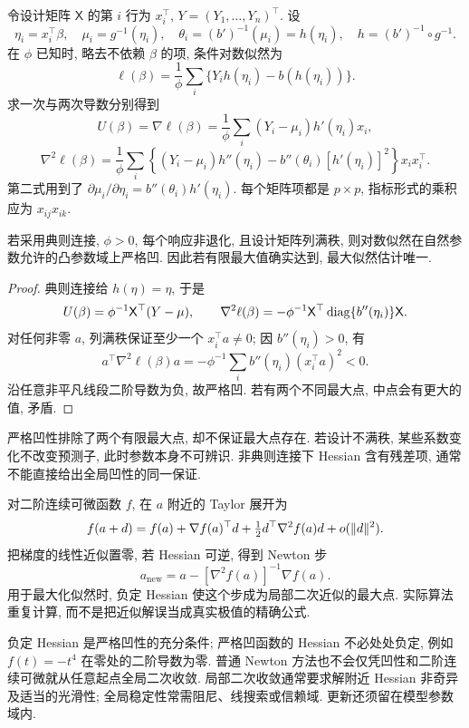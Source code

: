 令设计矩阵 $\mathsf X$ 的第 $i$ 行为 $x_i^\top$, $Y=(Y_1,\ldots,Y_n)^\top$. 设
\[
 \eta_i=x_i^\top\beta,\quad\mu_i=g^{-1}(\eta_i),\quad
 \theta_i=(b')^{-1}(\mu_i)=h(\eta_i),\quad
 h=(b')^{-1}\circ g^{-1}.
\]
在 $\phi$ 已知时, 略去不依赖 $\beta$ 的项, 条件对数似然为
\[
 \ell(\beta)=\frac1\phi\sum_i\{Y_ih(\eta_i)-b(h(\eta_i))\}.
\]
求一次与两次导数分别得到
\[
 U(\beta)=\nabla\ell(\beta)
 =\frac1\phi\sum_i(Y_i-\mu_i)h'(\eta_i)x_i,
\]
\[
 \nabla^2\ell(\beta)
 =\frac1\phi\sum_i\left\{(Y_i-\mu_i)h''(\eta_i)
                  -b''(\theta_i)[h'(\eta_i)]^2\right\}x_ix_i^\top.
\]
第二式用到了 $\partial\mu_i/\partial\eta_i=b''(\theta_i)h'(\eta_i)$. 每个矩阵项都是 $p\times p$, 指标形式的乘积应为 $x_{ij}x_{ik}$. 

\begin{proposition}[典则连接下的凹性]
若采用典则连接, $\phi>0$, 每个响应非退化, 且设计矩阵列满秩, 则对数似然在自然参数允许的凸参数域上严格凹. 因此若有限最大值确实达到, 最大似然估计唯一. 
\end{proposition}
\begin{proof}
典则连接给 $h(\eta)=\eta$, 于是
\[
 U(\beta)=\phi^{-1}\mathsf X^\top(Y-\mu),\qquad
 \nabla^2\ell(\beta)=-\phi^{-1}\mathsf X^\top
      \operatorname{diag}\{b''(\eta_i)\}\mathsf X.
\]
对任何非零 $a$, 列满秩保证至少一个 $x_i^\top a\ne0$; 因 $b''(\eta_i)>0$, 有
\[
 a^\top\nabla^2\ell(\beta)a
 =-\phi^{-1}\sum_i b''(\eta_i)(x_i^\top a)^2<0.
\]
沿任意非平凡线段二阶导数为负, 故严格凹. 若有两个不同最大点, 中点会有更大的值, 矛盾. 
\end{proof}
严格凹性排除了两个有限最大点, 却不保证最大点存在. 若设计不满秩, 某些系数变化不改变预测子, 此时参数本身不可辨识. 非典则连接下 Hessian 含有残差项, 通常不能直接给出全局凹性的同一保证. 

对二阶连续可微函数 $f$, 在 $a$ 附近的 Taylor 展开为
\[
 f(a+d)=f(a)+\nabla f(a)^\top d
          +\tfrac12 d^\top\nabla^2f(a)d+o(\lVert d\rVert^2).
\]
把梯度的线性近似置零, 若 Hessian 可逆, 得到 Newton 步
\[
 a_{\mathrm{new}}=a-[\nabla^2f(a)]^{-1}\nabla f(a).
\]
用于最大化似然时, 负定 Hessian 使这个步成为局部二次近似的最大点. 实际算法重复计算, 而不是把近似解误当成真实极值的精确公式. 

\begin{remark}[收敛与二阶条件]
负定 Hessian 是严格凹性的充分条件; 严格凹函数的 Hessian 不必处处负定, 例如 $f(t)=-t^4$ 在零处的二阶导数为零. 普通 Newton 方法也不会仅凭凹性和二阶连续可微就从任意起点全局二次收敛. 局部二次收敛通常要求解附近 Hessian 非奇异及适当的光滑性; 全局稳定性常需阻尼、线搜索或信赖域. 更新还须留在模型参数域内. 
\end{remark}

